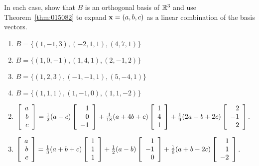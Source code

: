 \begin{multicols}{2}
\begin{ex}
In each case, show that $B$ is an orthogonal basis of $\mathbb{R}^3$ and use Theorem~\ref{thm:015082} to expand $\textbf{x} = (a, b, c)$ as a linear combination of the basis vectors.

\begin{enumerate}[label={\alph*.}]
\item $B = \{(1, -1, 3), (-2, 1, 1), (4, 7, 1)\}$

\item $B = \{(1, 0, -1), (1, 4, 1), (2, -1, 2)\}$

\item $B = \{(1, 2, 3), (-1, -1, 1), (5, -4, 1)\}$

\item $B = \{(1, 1, 1), (1, -1, 0), (1, 1, -2)\}$

\end{enumerate}
\begin{sol}
\begin{enumerate}[label={\alph*.}]
\setcounter{enumi}{1}
\item  
$ \left[ \begin{array}{r}
a\\
b\\
c
\end{array} \right]
= \tfrac{1}{2}(a - c)
\left[ \begin{array}{r}
1\\
0\\
-1
\end{array} \right]
+ \tfrac{1}{18}(a + 4b + c)
\left[ \begin{array}{r}
1\\
4\\
1
\end{array} \right]
+ \tfrac{1}{9}(2a - b + 2c)
\left[ \begin{array}{r}
2\\
-1\\
2
\end{array} \right]$.

\setcounter{enumi}{3}
\item  
$\left[ \begin{array}{r}
a\\
b\\
c
\end{array} \right]
= \tfrac{1}{3}(a + b + c)
\left[ \begin{array}{r}
1\\
1\\
1
\end{array} \right]
+ \tfrac{1}{2}(a - b)
\left[ \begin{array}{r}
1\\
-1\\
0
\end{array} \right]
+ \tfrac{1}{6}(a + b - 2c)
\left[ \begin{array}{r}
1\\
1\\
-2
\end{array} \right]$.


\end{enumerate}
\end{sol}
\end{ex}
\end{multicols}
